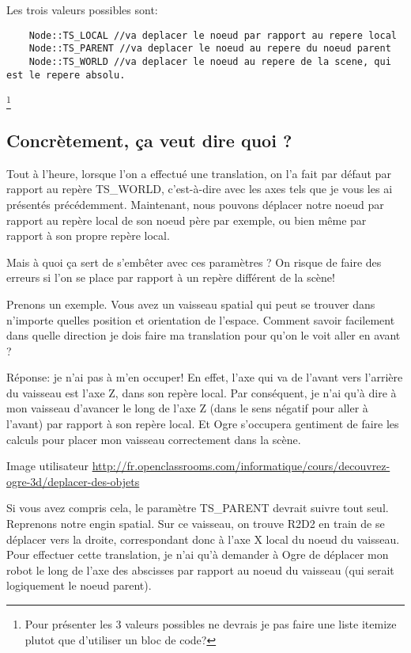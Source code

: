\documentclass[10pt,a4paper]{report}
\begin{document}
Les trois valeurs possibles sont:
\begin{lstlisting}
    Node::TS_LOCAL //va deplacer le noeud par rapport au repere local
    Node::TS_PARENT //va deplacer le noeud au repere du noeud parent
    Node::TS_WORLD //va deplacer le noeud au repere de la scene, qui est le repere absolu.
\end{lstlisting}\footnote{Pour présenter les 3 valeurs possibles ne devrais je pas faire une liste itemize plutot que d'utiliser un bloc de code?}



\subsection{Concr\`etement, \c{c}a veut dire quoi ?}

Tout \`{a} l'heure, lorsque l'on a effectu\'e une translation, on l'a fait par d\'efaut par rapport au rep\`ere TS\_WORLD, c'est-\`{a}-dire avec les axes tels que je vous les ai pr\'esent\'es pr\'ec\'edemment. Maintenant, nous pouvons d\'eplacer notre noeud par rapport au rep\`ere local de son noeud p\`ere par exemple, ou bien m\^eme par rapport \`{a} son propre rep\`ere local.

Mais \`{a} quoi \c{c}a sert de s'emb\^eter avec ces param\`etres ? On risque de faire des erreurs si l'on se place par rapport \`{a} un rep\`ere diff\'erent de la sc\`ene!

Prenons un exemple. Vous avez un vaisseau spatial qui peut se trouver dans n'importe quelles position et orientation de l'espace. Comment savoir facilement dans quelle direction je dois faire ma translation pour qu'on le voit aller en avant ?

R\'eponse: je n'ai pas \`{a} m'en occuper! En effet, l'axe qui va de l'avant vers l'arri\`ere du vaisseau est l'axe Z, dans son rep\`ere local. Par cons\'equent, je n'ai qu'\`{a} dire \`{a} mon vaisseau d'avancer le long de l'axe Z (dans le sens n\'egatif pour aller \`{a} l'avant) par rapport \`{a} son rep\`ere local. Et Ogre s'occupera gentiment de faire les calculs pour placer mon vaisseau correctement dans la sc\`ene.

Image utilisateur \url{http://fr.openclassrooms.com/informatique/cours/decouvrez-ogre-3d/deplacer-des-objets}

Si vous avez compris cela, le param\`etre TS\_PARENT devrait suivre tout seul. Reprenons notre engin spatial.
Sur ce vaisseau, on trouve R2D2 en train de se d\'eplacer vers la droite, correspondant donc \`{a} l'axe X local du noeud du vaisseau. Pour effectuer cette translation, je n'ai qu'\`{a} demander \`{a} Ogre de d\'eplacer mon robot le long de l'axe des abscisses par rapport au noeud du vaisseau (qui serait logiquement le noeud parent).
\end{document}
